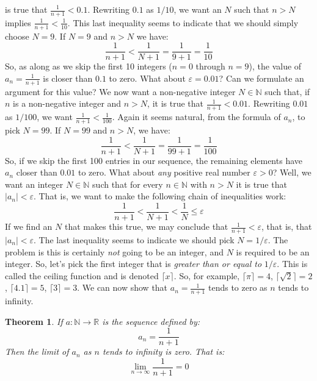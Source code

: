 \documentclass{article}
\theoremstyle{normal}
\theoremstyle{plain}
\newtheorem{theorem}{Theorem}
\newcommand{\ceil}[2][]{#1\lceil#2#1\rceil}
\begin{document}
    is true that $\frac{1}{n+1}<0.1$. Rewriting $0.1$ as $1/10$, we want an
    $N$ such that $n>N$ implies $\frac{1}{n+1}<\frac{1}{10}$. This last
    inequality seems to indicate that we should simply choose $N=9$. If
    $N=9$ and $n>N$ we have:
    \begin{equation}
        \frac{1}{n+1}<\frac{1}{N+1}=\frac{1}{9+1}=\frac{1}{10}
    \end{equation}
    So, as along as we skip the first 10 integers ($n=0$ through $n=9$), the
    value of $a_{n}=\frac{1}{n+1}$ is closer than $0.1$ to zero. What about
    $\varepsilon=0.01$? Can we formulate an argument for this value? We now
    want a non-negative integer $N\in\mathbb{N}$ such that, if $n$ is a
    non-negative integer and $n>N$, it is true that
    $\frac{1}{n+1}<0.01$. Rewriting $0.01$ as $1/100$, we want
    $\frac{1}{n+1}<\frac{1}{100}$. Again it seems natural, from the formula of
    $a_{n}$, to pick $N=99$. If $N=99$ and $n>N$, we have:
    \begin{equation}
        \frac{1}{n+1}<\frac{1}{N+1}=\frac{1}{99+1}=\frac{1}{100}
    \end{equation}
    So, if we skip the first 100 entries in our sequence, the remaining
    elements have $a_{n}$ closer than $0.01$ to zero. What about
    \textit{any} positive real number $\varepsilon>0$? Well, we want an
    integer $N\in\mathbb{N}$ such that for every $n\in\mathbb{N}$ with $n>N$
    it is true that $|a_{n}|<\varepsilon$. That is, we want to make the
    following chain of inequalities work:
    \begin{equation}
        \frac{1}{n+1}<\frac{1}{N+1}<\frac{1}{N}\leq\varepsilon
    \end{equation}
    If we find an $N$ that makes this true, we may conclude that
    $\frac{1}{n+1}<\varepsilon$, that is, that $|a_{n}|<\varepsilon$. The
    last inequality seems to indicate we should pick $N=1/\varepsilon$. The
    problem is this is certainly \textit{not} going to be an integer, and $N$
    is required to be an integer. So, let's pick the first integer that is
    \textit{greater than or equal to} $1/\varepsilon$. This is called the
    ceiling function and is denoted $\ceil{x}$. So, for example,
    $\ceil{\pi}=4$, $\ceil{\sqrt{2}}=2$, $\ceil{4.1}=5$, $\ceil{3}=3$. We can
    now show that $a_{n}=\frac{1}{n+1}$ tends to zero as $n$ tends to infinity.
    \begin{theorem}
        If $a:\mathbb{N}\rightarrow\mathbb{R}$ is the sequence defined by:
        \begin{equation}
            a_{n}=\frac{1}{n+1}
        \end{equation}
        Then the limit of $a_{n}$ as $n$ tends to infinity is zero. That is:
        \begin{equation}
            \lim_{n\rightarrow\infty}\frac{1}{n+1}=0
        \end{equation}
    \end{theorem}
\end{document}
